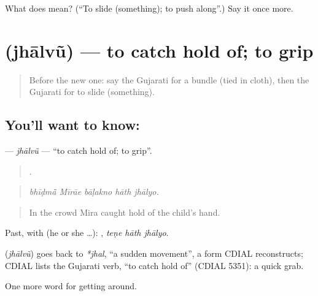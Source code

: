 \begin{tcolorbox}[breakable,colback=teal!4,colframe=teal!35!black,title={Before you move on}]
What does  mean? (\textquotedblleft{}To slide (something); to push along\textquotedblright{}.) Say it once more.
\end{tcolorbox}
\section[\texorpdfstring{\gu{ઝાલવું} (jhālvũ)}{ઝાલવું (jhālvũ)}]{ (jhālvũ) — to catch hold of; to grip}

\label{lesson:GU-C394-jhalvu}



\begin{quote}
Before the new one: say the Gujarati for a bundle (tied in cloth), then the Gujarati for to slide (something).
\end{quote}

\subsection*{You'll want to know: }
\textbf{} — \emph{jhālvũ} — \textquotedblleft{}to catch hold of; to grip\textquotedblright{}.

\begin{quote}
    .
\end{quote}

\begin{quote}
\emph{bhīḍmā̃ Mīrāe bāḷakno hāth jhālyo.}
\end{quote}

\begin{quote}
In the crowd Mira caught hold of the child's hand.
\end{quote}

Past, with  (he or she …):   , \emph{teṇe hāth jhālyo}.

\begin{cousinweb}
\textbf{} (\emph{jhālvũ}) goes back to \emph{*jhal}, \textquotedblleft{}a sudden movement\textquotedblright{}, a form CDIAL reconstructs; CDIAL lists the Gujarati verb, \textquotedblleft{}to catch hold of\textquotedblright{} (CDIAL 5351): a quick grab.
\end{cousinweb}

\begin{grammarlens}[title={What you've built}]
One more word for getting around.
\end{grammarlens}

